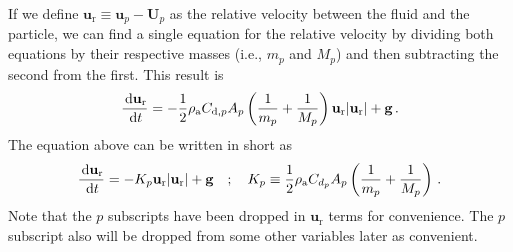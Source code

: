 If we define $\mathbf{u}_\text{r} \equiv \mathbf{u}_p - \mathbf{U}_p$ as the relative velocity between the fluid and the particle, we can find a single equation for the relative velocity by dividing both equations by their respective masses (i.e., $m_p$ and $M_p$) and then subtracting the second from the first. This result is
\begin{align}
    \frac{\,\mathrm{d} \mathbf{u}_\text{r}}{\,\mathrm{d} t} = -\frac{1}{2} \rho_\text{a} C_{\text{d},p} A_p \left(\frac{1}{m_p} + \frac{1}{M_p} \right) \mathbf{u}_\text{r} |\mathbf{u}_\text{r}| + \mathbf{g} \,.
\end{align}
The equation above can be written in short as
\begin{align}
    \frac{\,\mathrm{d} \mathbf{u}_\text{r}}{\,\mathrm{d} t} = -K_p \mathbf{u}_\text{r} |\mathbf{u}_\text{r}| + \mathbf{g} \quad ; \quad K_p \equiv \frac{1}{2} \rho_\text{a} C_{d_p} A_p \left(\frac{1}{m_p} + \frac{1}{M_p} \right) \,.
\end{align}
Note that the $p$ subscripts have been dropped in $\mathbf{u}_\text{r}$ terms for convenience. The $p$ subscript also will be dropped from some other variables later as convenient.

